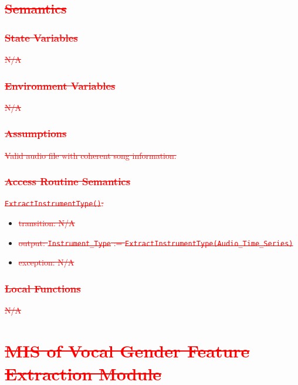 \documentclass[12pt, titlepage]{article}
\begin{document}
\subsection{\textcolor{red}{\sout{Semantics}}}

\subsubsection{\textcolor{red}{\sout{State Variables}}}
\textcolor{red}{\sout{N/A}}

\subsubsection{\textcolor{red}{\sout{Environment Variables}}}
\textcolor{red}{\sout{N/A}}

\subsubsection{\textcolor{red}{\sout{Assumptions}}}
\textcolor{red}{\sout{Valid audio file with coherent song information.}}

\subsubsection{\textcolor{red}{\sout{Access Routine Semantics}}}

\noindent \textcolor{red}{\sout{\texttt{ExtractInstrumentType()}:}}
\begin{itemize}
\item \textcolor{red}{\sout{transition: N/A}}
\item \textcolor{red}{\sout{output: \texttt{Instrument\_Type} := \texttt{ExtractInstrumentType(Audio\_Time\_Series)}}}
\item \textcolor{red}{\sout{exception: N/A}}
\end{itemize}

\subsubsection{\textcolor{red}{\sout{Local Functions}}}
\textcolor{red}{\sout{N/A}}

\section{\textcolor{red}{\sout{MIS of Vocal Gender Feature Extraction Module}}} 
\end{document}
